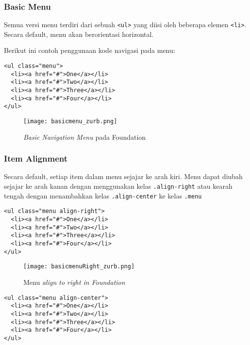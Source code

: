 \begin{enumerate}
\subsubsection{Basic Menu}
\label{sssec:navigation_1}

Semua versi menu terdiri dari sebuah \texttt{<ul>} yang diisi oleh beberapa elemen \texttt{<li>}. Secara default, menu akan berorientasi horizontal.\cite{zurbfoundation:17}

Berikut ini contoh penggunaan kode navigasi pada menu:

\begin{lstlisting}[frame=single] 
<ul class="menu">
  <li><a href="#">One</a></li>
  <li><a href="#">Two</a></li>
  <li><a href="#">Three</a></li>
  <li><a href="#">Four</a></li>
</ul>
\end{lstlisting}

\begin{figure} [H]  
    \centering  
	\texttt{[image: basicmenu\_zurb.png]}  
	\caption{\textit{Basic Navigation Menu} pada Foundation}
	\label{fig:gridbasic_zurb} 
\end{figure}

\subsubsection{Item Alignment}
\label{sssec:navigation_2}
Secara default, setiap item dalam menu sejajar ke arah kiri. Menu dapat diubah sejajar ke arah kanan dengan menggunakan kelas \texttt{.align-right} atau kearah tengah dengan menambahkan kelas \texttt{.align-center} ke kelas \texttt{.menu} \cite{zurbfoundation:17}
\begin{lstlisting}[frame=single] 
<ul class="menu align-right">
  <li><a href="#">One</a></li>
  <li><a href="#">Two</a></li>
  <li><a href="#">Three</a></li>
  <li><a href="#">Four</a></li>
</ul>
\end{lstlisting}

\begin{figure} [H]
	\centering  
	\texttt{[image: basicmenuRight\_zurb.png]}  
	\caption{Menu \textit{align to right in Foundation}}
	\label{fig:gridbasic_zurb} 
\end{figure}

\begin{lstlisting}[frame=single] 
<ul class="menu align-center">
  <li><a href="#">One</a></li>
  <li><a href="#">Two</a></li>
  <li><a href="#">Three</a></li>
  <li><a href="#">Four</a></li>
</ul>
\end{lstlisting}


\end{enumerate}
